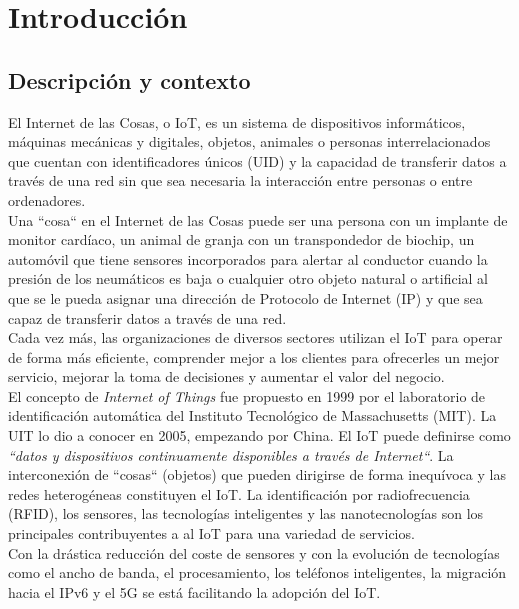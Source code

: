 \chapter{Introducción}

\section{Descripción y contexto}

El Internet de las Cosas, o IoT, es un sistema de dispositivos informáticos, máquinas mecánicas y digitales, objetos, animales o personas interrelacionados que cuentan con identificadores únicos (UID) y la capacidad de transferir datos a través de una red sin que sea necesaria la interacción entre personas o entre ordenadores.\\

Una ``cosa`` en el Internet de las Cosas puede ser una persona con un implante de monitor cardíaco, un animal de granja con un transpondedor de biochip, un automóvil que tiene sensores incorporados para alertar al conductor cuando la presión de los neumáticos es baja o cualquier otro objeto natural o artificial al que se le pueda asignar una dirección de Protocolo de Internet (IP) y que sea capaz de transferir datos a través de una red.\\

Cada vez más, las organizaciones de diversos sectores utilizan el IoT para operar de forma más eficiente, comprender mejor a los clientes para ofrecerles un mejor servicio, mejorar la toma de decisiones y aumentar el valor del negocio.\\


El concepto de \textit{Internet of Things} fue propuesto en 1999 por el laboratorio de identificación automática del Instituto Tecnológico de Massachusetts (MIT). La UIT lo dio a conocer en 2005, empezando por China. El IoT puede definirse como \textit{``datos y dispositivos continuamente disponibles a través de Internet``}. La interconexión de ``cosas`` (objetos) que pueden dirigirse de forma inequívoca y las redes heterogéneas constituyen el IoT. La identificación por radiofrecuencia (RFID), los sensores, las tecnologías inteligentes y las nanotecnologías son los principales contribuyentes a al IoT para una variedad de servicios.\\

Con la drástica reducción del coste de sensores y con la evolución de tecnologías como el ancho de banda, el procesamiento, los teléfonos inteligentes, la migración hacia el IPv6 y el 5G se está facilitando la adopción del IoT.\\

